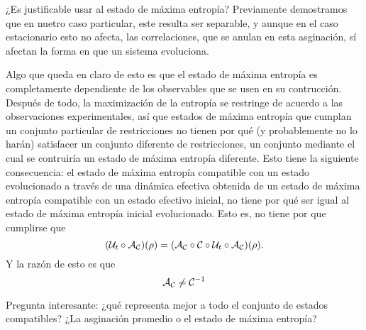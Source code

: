 ¿Es justificable usar al estado de máxima entropía? Previamente demostramos que en nuetro caso particular, este resulta ser separable, y aunque en el caso estacionario esto no afecta, las correlaciones, que se anulan en esta asginación, sí afectan la forma en que un sistema evoluciona.

Algo que queda en claro de esto es que el estado de máxima entropía es completamente dependiente de los observables que se usen en su contrucción. Después de todo, la maximización de la entropía se restringe de acuerdo a las observaciones experimentales, así que estados de máxima entropía que cumplan un conjunto particular de restricciones no tienen por qué (y probablemente no lo harán) satisfacer un conjunto diferente de restricciones, un conjunto mediante el cual se contruiría un estado de máxima entropía diferente. Esto tiene la siguiente consecuencia: el estado de máxima entropía compatible con un estado evolucionado a través de una dinámica efectiva obtenida de un estado de máxima entropía compatible con un estado efectivo inicial, no tiene por qué ser igual al estado de máxima entropía inicial evolucionado. Esto es, no tiene por que cumplirse que
\begin{equation*}
    (\mathcal{U}_{t}\circ\mathcal{A}_{\mathcal{C}})(\rho) = (\mathcal{A}_{\mathcal{C}}\circ\mathcal{C} \circ \mathcal{U}_t \circ \mathcal{A}_{\mathcal{C}})(\rho).
\end{equation*}
Y la razón de esto es que
\begin{equation*}
    \mathcal{A}_{\mathcal{C}}\neq\mathcal{C}^{-1}
\end{equation*}

Pregunta interesante: ¿qué representa mejor a todo el conjunto de estados compatibles? ¿La asginación promedio o el estado de máxima entropía?


